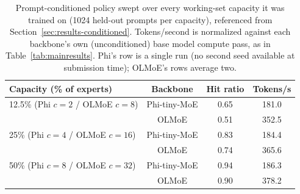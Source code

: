 \documentclass{article}
\begin{document}
\begin{table}[h]
\centering
\small
\caption{Absolute results on OLMoE-1B-7B (1024 held-out prompts), at the trained working-set
capacity ($c=16$, top-8) -- the source values for Table~\ref{tab:mainresults}'s OLMoE
$\Delta$ columns. Base and SFT are averaged over two seeds; CAR-MoE, option-critic, and
MELINOE are a single seed (see the note in Section~\ref{sec:results-unconditioned}).
Tokens/second normalized against the base model's own compute pass as above. CAR-MoE
(+SFT) was still running at submission time and is omitted.}
\label{tab:olmoeresults_full}
\end{table}

\begin{table}[h]
\centering
\small
\caption{Prompt-conditioned policy swept over every working-set capacity it was trained on
(1024 held-out prompts per capacity), referenced from Section~\ref{sec:results-conditioned}.
Tokens/second is normalized against each backbone's own (unconditioned) base model compute
pass, as in Table~\ref{tab:mainresults}. Phi's row is a single run (no second seed available
at submission time); OLMoE's rows average two.}
\label{tab:conditioned}
\begin{tabular}{lccc}
\toprule
Capacity (\% of experts) & Backbone & Hit ratio & Tokens/s \\
\midrule
12.5\% (Phi $c=2$ / OLMoE $c=8$)  & Phi-tiny-MoE & 0.65 & 181.0 \\
                                  & OLMoE        & 0.51 & 352.5 \\
\midrule
25\% (Phi $c=4$ / OLMoE $c=16$)   & Phi-tiny-MoE & 0.83 & 184.4 \\
                                  & OLMoE        & 0.74 & 365.6 \\
\midrule
50\% (Phi $c=8$ / OLMoE $c=32$)   & Phi-tiny-MoE & 0.94 & 186.3 \\
                                  & OLMoE        & 0.90 & 378.2 \\
\bottomrule
\end{tabular}
\end{table}
\end{document}
